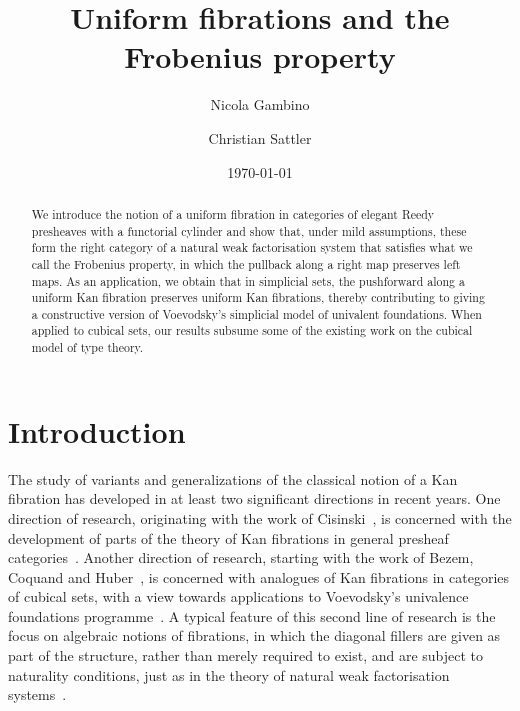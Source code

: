 \documentclass[reqno,10pt,a4paper,oneside]{amsart}
\title{Uniform fibrations and
the Frobenius property}
\begin{document}
\begin{abstract}
We introduce the notion of a uniform fibration in categories of elegant Reedy presheaves
with a functorial cylinder 
and show that, under mild assumptions, these form the right category of a natural weak
factorisation system that satisfies what we call the Frobenius property, \ie in which the
pullback along a right map preserves left maps. As an application, we obtain that in
simplicial sets,  the pushforward along a uniform Kan
fibration preserves uniform Kan fibrations, thereby contributing to giving a constructive
version of Voevodsky's simplicial model of univalent foundations. When applied
to cubical sets, our results  subsume some of the existing work on the cubical
model of type theory.
\end{abstract}

\author{Nicola Gambino}
\address{School of Mathematics, University of Leeds, Leeds LS2 9JT, UK}

\author{Christian Sattler}
\address{School of Mathematics, University of Leeds, Leeds LS2 9JT, UK}

\date{\today}

\maketitle

 \tableofcontents


\section*{Introduction}

The study of variants and generalizations of the classical notion of a Kan fibration has developed
in at least two significant directions in recent years. One direction of research, originating with the work of
Cisinski~\cite{cisinski-asterisque}, is concerned with the development of  parts of the theory of Kan fibrations in
general presheaf categories~\cite{cisinski-univalence,moerdijk-minimal}.  Another direction of
research, starting with the work of Bezem, Coquand and Huber~\cite{coquand-cubical-sets},
 is concerned with 
analogues of Kan fibrations in categories of cubical sets,
with a view towards applications to Voevodsky's univalence foundations programme~\cite{awodey-cubical,coquand-cubical-sets,coquand-variation,huber-thesis,pitts-cubical-nominal,swan-awfs}. A typical feature of this second line of research is  the focus on algebraic notions of fibrations, in which the diagonal fillers are given as part of the structure, rather than merely required to
exist, and are subject to naturality conditions, just as 
in the theory of natural weak factorisation 
systems~\cite{grandis-tholen-nwfs}.
\end{document}
